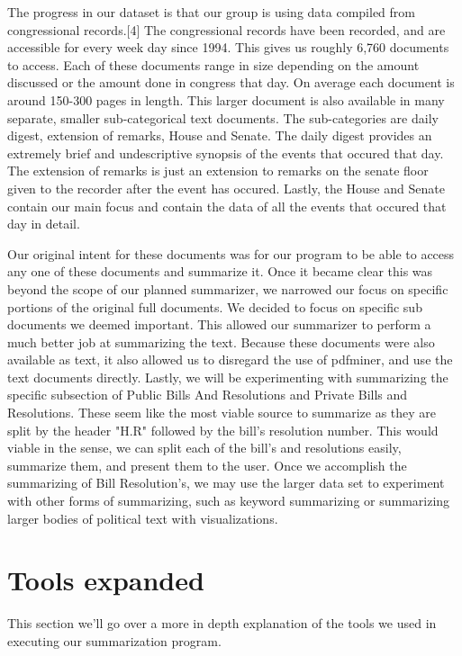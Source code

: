\documentclass[11pt,a4paper]{article}
\begin{document}
The progress in our dataset is that our group is using data compiled from congressional records.[4] The congressional records have been recorded, and are accessible for every week day since 1994. This gives us roughly 6,760 documents to access. Each of these documents range in size depending on the amount discussed or the amount done in congress that day. On average each document is around 150-300 pages in length. 
\newline\indent This larger document is also available in many separate, smaller sub-categorical text documents. The sub-categories are daily digest, extension of remarks, House and Senate. The daily digest provides an extremely brief and undescriptive synopsis of the events that occured that day. The extension of remarks is just an extension to remarks on the senate floor given to the recorder after the event has occured. 
\newline\indent Lastly, the House and Senate contain our main focus and contain the data of all the events that occured that day in detail. 

Our original intent for these documents was for our program to be able to access any one of these documents and summarize it. Once it became clear this was beyond the scope of our planned summarizer, we narrowed our focus on specific portions of the original full documents. We decided to focus on specific sub documents we deemed important. This allowed our summarizer to perform a much better job at summarizing the text. Because these documents were also available as text, it also allowed us to disregard the use of pdfminer, and use the text documents directly. Lastly, we will be experimenting with summarizing the specific subsection of Public Bills And Resolutions and Private Bills and Resolutions. These seem like the most viable source to summarize as they are split by the header "H.R" followed by the bill's resolution number. This would viable in the sense, we can split each of the bill's and resolutions easily, summarize them, and present them to the user. 
Once we accomplish the summarizing of Bill Resolution's, we may use the larger data set to experiment with other forms of summarizing, such as keyword summarizing or summarizing larger bodies of political text with visualizations.  
\section{Tools expanded}
This section we'll go over a more in depth explanation of the tools we used in executing our summarization program.
\end{document}
